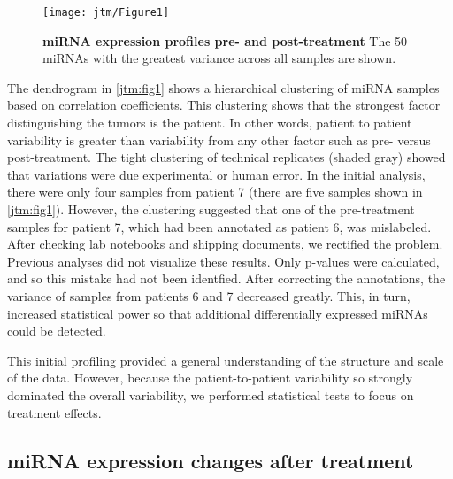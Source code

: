 \begin{figure}[h!]
  \centering
  \texttt{[image: jtm/Figure1]}
  \caption[miRNA expression profiles pre- and post-treatment]{
       \textbf{miRNA expression profiles pre- and post-treatment}
       The 50 miRNAs with the greatest variance across all samples are shown.
  }
  \label{jtm:fig1}
\end{figure}

The dendrogram in \autoref{jtm:fig1} shows a hierarchical
clustering of miRNA samples based on correlation coefficients. 
This clustering shows that the strongest
factor distinguishing the tumors is the patient. In other words, patient to patient
variability is greater than variability from any other factor such as pre- versus post-treatment.
The tight clustering of technical replicates (shaded gray) showed that variations
were due experimental or human error.
In the initial analysis, there were only four 
samples from patient 7 (there are five samples
shown in \autoref{jtm:fig1}). However, the clustering suggested
 that one of the pre-treatment samples for patient
7, which had been annotated as patient 6, was mislabeled. After checking lab notebooks
and shipping documents, we rectified the problem. Previous analyses did not visualize these results.
Only p-values were calculated, and so this mistake had not been identfied. After correcting
the annotations, the variance of samples from patients 6 and 7 decreased greatly.
This, in turn, increased statistical power so that additional differentially expressed miRNAs could
be detected.

This initial profiling provided a general understanding of the structure and scale
of the data. However, because the patient-to-patient variability so strongly
dominated the overall variability, we performed statistical tests to focus
on treatment effects.

\subsection{miRNA expression changes after treatment}

